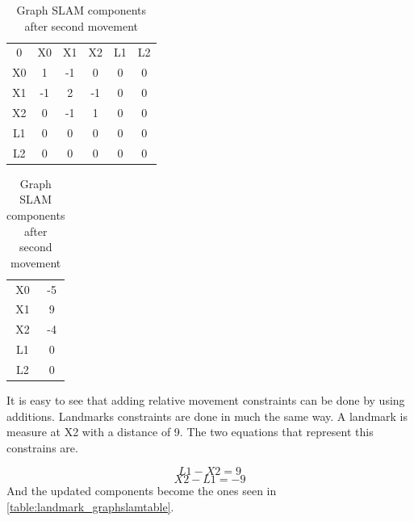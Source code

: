 \documentclass[Main]{subfiles}
\begin{document}
\begin{table}[H]
	\begin{subtable}{0.5\linewidth}
		\centering
	\begin{tabular}{cccccc}
		0 & X0 & X1 & X2 & L1 & L2 \\ 
		X0 & 1 & -1 & 0 & 0 & 0  \\ 
		X1 & -1 & 2 & -1 & 0 & 0  \\ 
		X2 & 0 & -1 & 1 & 0 & 0  \\  
		L1 & 0 & 0 & 0 & 0 & 0  \\ 
		L2 & 0 & 0 & 0 & 0 & 0  \\ 
	\end{tabular}
	\caption{$\Omega$ }
	\end{subtable}
	\begin{subtable}{0.5\linewidth}
		\centering
		\begin{tabular}{cc}
			X0 & -5 \\ 
			X1 & 9 \\ 
			X2 & -4 \\ 
			L1 & 0 \\  
			L2 & 0 \\ 
		\end{tabular}
	\caption{$\xi$}
	\end{subtable}
\caption{Graph SLAM components after second movement}
\label{table:secondmovement_graphslamtable} 
\end{table} \noindent

It is easy to see that adding relative movement constraints can be done by using additions. Landmarks constraints are done in much the same way.
A landmark is measure at X2 with a distance of 9. The two equations that represent this constrains are.

	\begin{equation}
		L1 - X2 = 9
	\end{equation}
	\begin{equation}
		X2 - L1 = -9
	\end{equation}
And the updated components become the ones seen in \autoref{table:landmark_graphslamtable}.
\end{document}

